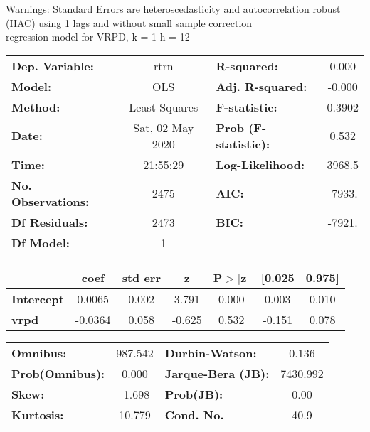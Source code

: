 Warnings: \newline
 [1] Standard Errors are heteroscedasticity and autocorrelation robust (HAC) using 1 lags and without small sample correction\\ 

regression model for VRPD, k = 1 h = 12\begin{center}
\begin{tabular}{lclc}
\toprule
\textbf{Dep. Variable:}    &       rtrn       & \textbf{  R-squared:         } &     0.000   \\
\textbf{Model:}            &       OLS        & \textbf{  Adj. R-squared:    } &    -0.000   \\
\textbf{Method:}           &  Least Squares   & \textbf{  F-statistic:       } &    0.3902   \\
\textbf{Date:}             & Sat, 02 May 2020 & \textbf{  Prob (F-statistic):} &    0.532    \\
\textbf{Time:}             &     21:55:29     & \textbf{  Log-Likelihood:    } &    3968.5   \\
\textbf{No. Observations:} &        2475      & \textbf{  AIC:               } &    -7933.   \\
\textbf{Df Residuals:}     &        2473      & \textbf{  BIC:               } &    -7921.   \\
\textbf{Df Model:}         &           1      & \textbf{                     } &             \\
\bottomrule
\end{tabular}
\begin{tabular}{lcccccc}
                   & \textbf{coef} & \textbf{std err} & \textbf{z} & \textbf{P$> |$z$|$} & \textbf{[0.025} & \textbf{0.975]}  \\
\midrule
\textbf{Intercept} &       0.0065  &        0.002     &     3.791  &         0.000        &        0.003    &        0.010     \\
\textbf{vrpd}      &      -0.0364  &        0.058     &    -0.625  &         0.532        &       -0.151    &        0.078     \\
\bottomrule
\end{tabular}
\begin{tabular}{lclc}
\textbf{Omnibus:}       & 987.542 & \textbf{  Durbin-Watson:     } &    0.136  \\
\textbf{Prob(Omnibus):} &   0.000 & \textbf{  Jarque-Bera (JB):  } & 7430.992  \\
\textbf{Skew:}          &  -1.698 & \textbf{  Prob(JB):          } &     0.00  \\
\textbf{Kurtosis:}      &  10.779 & \textbf{  Cond. No.          } &     40.9  \\
\bottomrule
\end{tabular}
\end{center}

